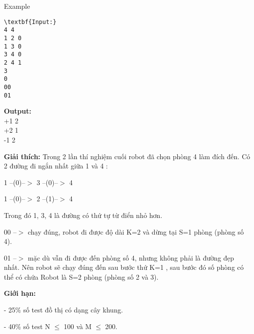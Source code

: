 Example
\begin{verbatim}
\textbf{Input:}
4 4
1 2 0
1 3 0
3 4 0
2 4 1
3
0
00
01\end{verbatim}

\textbf{Output:}
\\+1 2
\\+2 1
\\-1 2

\textbf{Giải thích: } Trong 2 lần thí nghiệm cuối robot đã chọn phòng 4 làm đích đến. Có 2 đường đi ngắn nhất giữa 1 và 4 :

1 --(0)--$>$ 3 --(0)--$>$ 4

1 --(0)--$>$ 2 --(1)--$>$ 4

Trong đó 1, 3, 4 là đường có thứ tự từ điển nhỏ hơn.

00 --$>$ chạy đúng, robot đi được độ dài K=2 và dừng tại S=1 phòng (phòng số 4).

01 --$>$ mặc dù vẫn đi được đến phòng số 4, nhưng không phải là đường đẹp nhất. Nên robot sẽ chạy đúng đến sau bước thứ K=1 , sau bước đó số phòng có thể có chứa Robot là S=2 phòng (phòng số 2 và 3).

\textbf{Giới hạn: }

- 25\% số test đồ thị có dạng cây khung.

- 40\% số test N $\le$ 100 và M $\le$ 200.